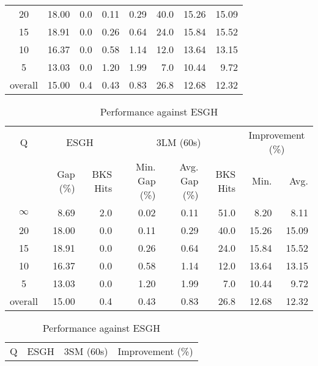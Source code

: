 \begin{table}[H]
\begin{tabular}{c rr rrr rr}
      20 &    18.00 &      0.0 &          0.11 &          0.29 &     40.0 &            15.26 & 15.09 \\
      15 &    18.91 &      0.0 &          0.26 &          0.64 &     24.0 &            15.84 & 15.52 \\
      10 &    16.37 &      0.0 &          0.58 &          1.14 &     12.0 &            13.64 & 13.15 \\
       5 &    13.03 &      0.0 &          1.20 &          1.99 &      7.0 &            10.44 &  9.72 \\
\midrule
 overall &    15.00 &      0.4 &          0.43 &          0.83 &     26.8 &            12.68 & 12.32 \\
\bottomrule
\end{tabular}
\end{table}\begin{table}[H]
\centering
\caption{Performance against ESGH}
\label{tab:3lm_resuts_kritikos1}
\begin{tabular}{c rr rrr rr}
\toprule
       Q & \multicolumn{2}{c}{ESGH} & \multicolumn{3}{c}{3LM (60s)} & \multicolumn{2}{c}{Improvement (\%)} \\
         & Gap (\%) & BKS Hits & Min. Gap (\%) & Avg. Gap (\%) & BKS Hits &             Min. &  Avg. \\
\midrule
$\infty$ &     8.69 &      2.0 &          0.02 &          0.11 &     51.0 &             8.20 &  8.11 \\
      20 &    18.00 &      0.0 &          0.11 &          0.29 &     40.0 &            15.26 & 15.09 \\
      15 &    18.91 &      0.0 &          0.26 &          0.64 &     24.0 &            15.84 & 15.52 \\
      10 &    16.37 &      0.0 &          0.58 &          1.14 &     12.0 &            13.64 & 13.15 \\
       5 &    13.03 &      0.0 &          1.20 &          1.99 &      7.0 &            10.44 &  9.72 \\
\midrule
 overall &    15.00 &      0.4 &          0.43 &          0.83 &     26.8 &            12.68 & 12.32 \\
\bottomrule
\end{tabular}
\end{table}\begin{table}[H]
\caption{Performance against ESGH}
\label{tab:3lm_resuts_kritikos1}
\begin{tabular}{c rr rrr rr}
\toprule
Q & \multicolumn{2}{c}{ESGH} & \multicolumn{3}{c}{3SM (60s)} & \multicolumn{2}{c}{Improvement (\%)} \\

\end{tabular}
\end{table}
